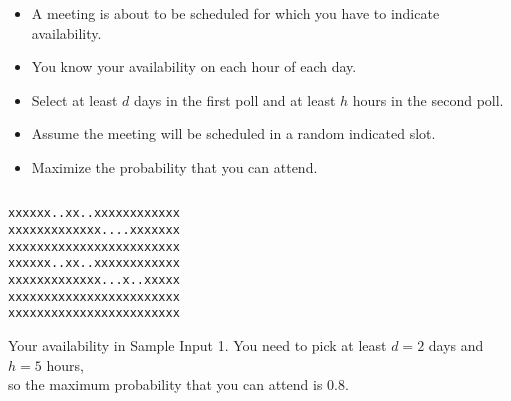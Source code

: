 \begin{frame}[fragile]
    \frametitle{\problemtitle}

    \begin{columns}
        \begin{column}[T]{.80\textwidth}
            \begin{itemize}
                \item A meeting is about to be scheduled for which you have to
                  indicate availability.
                \item You know your availability on each hour of each day.
                \item Select at least $d$ days in the first poll and at least $h$ hours in the second poll.
                \item Assume the meeting will be scheduled in a random indicated slot.
                \item Maximize the probability that you can attend.
            \end{itemize}
        \end{column}
    \end{columns}

    \begin{center}
        \begin{lstlisting}[basicstyle=\ttfamily,linewidth=0.68\textwidth,xleftmargin=0.32\textwidth]
xxxxxx..xx..xxxxxxxxxxxx
xxxxxxxxxxxxx....xxxxxxx
xxxxxxxxxxxxxxxxxxxxxxxx
xxxxxx..xx..xxxxxxxxxxxx
xxxxxxxxxxxxx...x..xxxxx
xxxxxxxxxxxxxxxxxxxxxxxx
xxxxxxxxxxxxxxxxxxxxxxxx
        \end{lstlisting}
        \small
        Your availability in Sample Input 1.
        You need to pick at least $d=2$ days and $h=5$ hours, \\
        so the maximum probability that you can attend is $0.8$.
    \end{center}
\end{frame}
